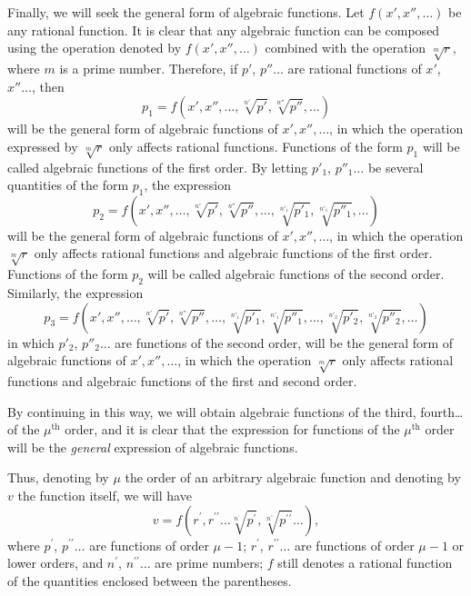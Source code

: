 \documentclass[oneside, 12 pt, leqno]{memoir}
\begin{document}
Finally, we will seek the general form of algebraic functions. Let \( f(x', x'', \dots) \) be any rational function. It is clear that any algebraic function can be composed using the operation denoted by \( f(x', x'', \dots) \) combined with the operation \( \sqrt[m]{r} \), where \( m \) is a prime number. Therefore, if \( p' \), \( p'' \dots \) are rational functions of \( x' \), \( x''\dots \), then
\[ p_1 = f\left(x', x'', \dots, \sqrt[n']{p'}, \sqrt[n'']{p''}, \dots\right) \]
will be the general form of algebraic functions of \( x', x'', \dots \), in which the operation expressed by \( \sqrt[m]{r} \) only affects rational functions. Functions of the form \( p_1 \) will be called algebraic functions of the first order. By letting \( p'_1 \), \( p''_1 \dots \) be several quantities of the form \( p_1 \), the expression
\[ p_2 = f\left(x', x'', \dots, \sqrt[n']{p'}, \sqrt[n'']{p''}, \dots, \sqrt[n'_1]{p'_1}, \sqrt[n'_1]{p''_1}, \dots\right) \]
will be the general form of algebraic functions of \( x', x'', \dots \), in which the operation \( \sqrt[m]{r} \) only affects rational functions and algebraic functions of the first order. Functions of the form \( p_2 \) will be called algebraic functions of the second order. Similarly, the expression
\[ p_3 = f\left(x', x'', \dots, \sqrt[n']{p'}, \sqrt[n'']{p''}, \dots, \sqrt[n'_1]{p'_1}, \sqrt[n'_1]{p''_1}, \dots, \sqrt[n'_2]{p'_2}, \sqrt[n'_2]{p''_2}, \dots \right) \]
in which \( p'_2 \), \( p''_2 \dots \) are functions of the second order, will be the general form of algebraic functions of \( x', x'', \dots \), in which the operation \( \sqrt[m]{r} \) only affects rational functions and algebraic functions of the first and second order.

By continuing in this way, we will obtain algebraic functions of the third, fourth\dots of the \(\mu^{\text{th}}\) order, and it is clear that the expression for functions of the \(\mu^{\text{th}}\) order will be the \textit{general} expression of algebraic functions.

Thus, denoting by \(\mu\) the order of an arbitrary algebraic function and denoting by \(v\) the function itself, we will have
\[v=f\left(r^{\prime}, r^{\prime \prime} \dots \sqrt[n^{\prime}]{p^{\prime}}, \sqrt[n^{\prime \prime}]{p^{\prime \prime}} \dots\right),\]
where \(p^{\prime}\), \(p^{\prime \prime} \dots\) are functions of order \({\mu}-1\); \(r^{\prime}\), \(r^{\prime \prime} \dots\) are functions of order \(\mu-1\) or lower orders, and \(n^{\prime}\), \(n^{\prime \prime} \dots\) are prime numbers; \(f\) still denotes a rational function of the quantities enclosed between the parentheses.
\end{document}
